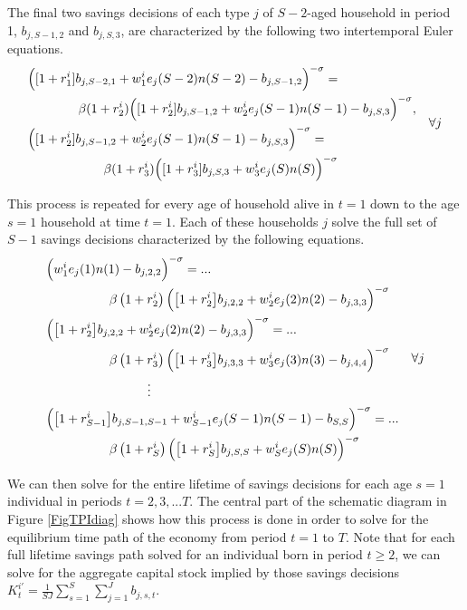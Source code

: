 \documentclass[letterpaper,12pt]{article}
\theoremstyle{definition}
\begin{document}
  The final two savings decisions of each type $j$ of $S-2$-aged household in period 1, $b_{j,S-1,2}$ and $b_{j,S,3}$, are characterized by the following two intertemporal Euler equations.
  \begin{equation}\label{EqEulerSm2p1}
    \begin{split}
      &\Bigl([1+r_1^i]b_{j,S-2,1} + w_1^i e_j(S-2)n(S-2) - b_{j,S-1,2}\Bigr)^{-\sigma} = \\
      &\quad\quad\quad\quad \beta(1+r_2^i)\Bigl([1+r_2^i]b_{j,S-1,2} + w_2^i e_j(S-1)n(S-1) - b_{j,S,3}\Bigr)^{-\sigma}, \\
      &\Bigl([1+r_2^i]b_{j,S-1,2} + w_2^i e_j(S-1)n(S-1) - b_{j,S,3}\Bigr)^{-\sigma} = \\
      &\quad\quad\quad\quad\quad\quad \beta(1+r_3^i)\Bigl([1+r_3^i]b_{j,S,3} + w_3^i e_j(S)n(S)\Bigr)^{-\sigma}
    \end{split} \quad\forall j
  \end{equation}

  This process is repeated for every age of household alive in $t=1$ down to the age $s=1$ household at time $t=1$. Each of these households $j$ solve the full set of $S-1$ savings decisions characterized by the following equations.
  \begin{equation}\label{EqEulerFullp1}
    \begin{split}
      &\Bigl(w_1^i e_j(1)n(1) - b_{j,2,2}\Bigr)^{-\sigma} = ... \\
      &\quad\quad\quad\quad\quad \beta\left(1+r_2^i\right)\Bigl(\bigl[1+r_2^i\bigr]b_{j,2,2} + w_2^i e_j(2)n(2) - b_{j,3,3}\Bigr)^{-\sigma} \\
      &\Bigl(\bigl[1+r_2^i\bigr]b_{j,2,2} + w_2^i e_j(2)n(2) - b_{j,3,3}\Bigr)^{-\sigma} = ... \\
      &\quad\quad\quad\quad\quad \beta\left(1 + r_3^i\right)\Bigl(\bigl[1+r_3^i\bigr]b_{j,3,3} + w_3^i e_j(3)n(3) - b_{j,4,4}\Bigr)^{-\sigma} \\
      &\quad\quad\quad\quad\quad\quad\quad\quad\vdots \\
      &\Bigl(\bigl[1 + r_{S-1}^i\bigr]b_{j,S-1,S-1} + w_{S-1}^i e_j(S-1)n(S-1) - b_{S,S}\Bigr)^{-\sigma} = ... \\
      &\quad\quad\quad\quad\quad \beta\left(1 + r_S^i\right)\Bigl(\bigl[1+r_S^i\bigr]b_{j,S,S} + w_S^i e_j(S)n(S)\Bigr)^{-\sigma}
    \end{split}\quad\forall j
  \end{equation}

  We can then solve for the entire lifetime of savings decisions for each age $s=1$ individual in periods $t=2,3,...T$. The central part of the schematic diagram in Figure \ref{FigTPIdiag} shows how this process is done in order to solve for the equilibrium time path of the economy from period $t=1$ to $T$. Note that for each full lifetime savings path solved for an individual born in period $t\geq 2$, we can solve for the aggregate capital stock implied by those savings decisions $K_t^{i'}=\frac{1}{SJ}\sum_{s=1}^S\sum_{j=1}^J b_{j,s,t}$.
\end{document}
